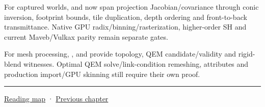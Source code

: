 For captured worlds,  and  now span projection Jacobian/covariance through conic inversion, footprint bounds, tile duplication, depth ordering and front-to-back transmittance. Native GPU radix/binning/rasterization, higher-order SH and current Maveb/Vulkax parity remain separate gates.

For mesh processing, ,  and  provide topology, QEM candidate/validity and rigid-blend witnesses. Optimal QEM solve/link-condition remeshing, attributes and production import/GPU skinning still require their own proof.

\begin{center}\rule{0.5\linewidth}{0.5pt}\end{center}

\hyperref[volume-reading-map]{Reading map} · \hyperref[04-visual-computing-ii-ch042-xr-radiometry-optics-and-perception]{Previous chapter}
